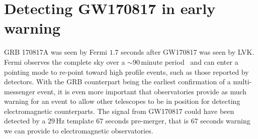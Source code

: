 \section{\label{6:sec:gw170817-in-ew}Detecting GW170817 in early warning}

GRB 170817A was seen by Fermi $1.7$ seconds after GW170817 was seen by LVK. Fermi observes the complete sky over a ${\sim}90 \, \text{minute}$ period~\cite{Fermi:2022} and can enter a pointing mode to re-point toward high profile events, such as those reported by \gwadj detectors. With the GRB counterpart being the earliest confirmation of a multi-messenger event, it is even more important that \gwadj observatories provide as much warning for an event to allow other telescopes to be in position for detecting electromagnetic counterparts. The \gwadj signal from GW170817 could have been detected by a $29 \, \text{Hz}$ template $67$ seconds pre-merger, that is $67$ seconds warning we can provide to electromagnetic observatories.

